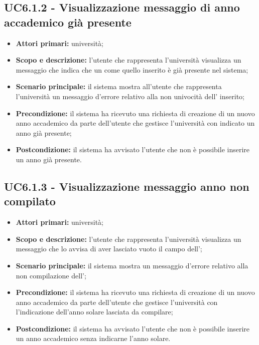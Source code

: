 \documentclass[AnalisiDeiRequisiti.tex]{subfiles}
\begin{document}
\subsection{UC6.1.2 - Visualizzazione messaggio di anno accademico già presente}
\begin{itemize}
	\item \textbf{Attori primari:} università;
	\item \textbf{Scopo e descrizione:} l'utente che rappresenta l'università visualizza un messaggio che indica che un  come quello inserito è già presente nel sistema;
	\item \textbf{Scenario principale:} il sistema mostra all'utente che rappresenta l'università un messaggio d'errore relativo alla non univocità dell' inserito;
	\item \textbf{Precondizione:} il sistema ha ricevuto una richiesta di creazione di un nuovo anno accademico da parte dell'utente che gestisce l'università con indicato un anno già presente;
	\item \textbf{Postcondizione:} il sistema ha avvisato l'utente che non è possibile inserire un anno già presente.
\end{itemize}
\subsection{UC6.1.3 - Visualizzazione messaggio anno non compilato}
\begin{itemize}
	\item \textbf{Attori primari:} università;
	\item \textbf{Scopo e descrizione:} l'utente che rappresenta l'università visualizza un messaggio che lo avvisa di aver lasciato vuoto il campo dell';
	\item \textbf{Scenario principale:} il sistema mostra un messaggio d'errore relativo alla non compilazione dell';
	\item \textbf{Precondizione:} il sistema ha ricevuto una richiesta di creazione di un nuovo anno accademico da parte dell'utente che gestisce l'università con l'indicazione dell'anno solare lasciata da compilare; 
	\item \textbf{Postcondizione:} il sistema ha avvisato l'utente che non è possibile inserire un anno accademico senza indicarne l'anno solare.
\end{itemize}
\end{document}
